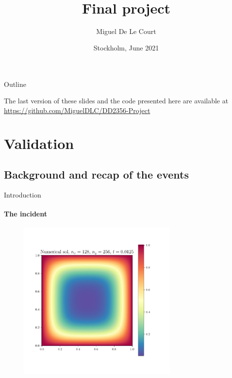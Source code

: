 \documentclass{beamer}
\title[Short Title]{%
    \color{white} Final project
    \vspace{0.5cm}
}
\author{Miguel De Le Court}
\institute{
        \textit{Methods in High performance computing}\\
        \textit{DD2356}
        \vspace{0.5cm}
}
\date[Venue and Date]{%
   Stockholm, June 2021 
}
\begin{document}

{
    \maketitle
}

\begin{frame}{Outline}
\tableofcontents

\vfill
\begin{center}
    \footnotesize The last version of these slides and the code presented here are available at \url{https://github.com/MiguelDLC/DD2356-Project}    
\end{center}

\end{frame}




\section{Validation}
\subsection{Background and recap of the events}
\begin{frame}{Introduction}
    \framesubtitle{The incident}

    \begin{figure}
        \centering
        \includegraphics[height=8cm]{Figures/sol.pdf}
    \end{figure}
\end{frame}





\end{document}
